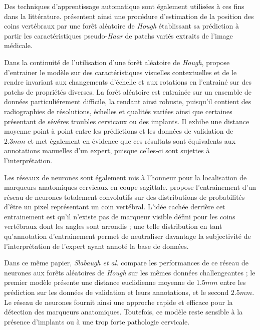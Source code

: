         Des techniques d'apprentissage automatique sont également utilisées à ces fins dans la littérature. \cite{AlArif2015a, AlArif2015b} présentent ainsi une procédure d'estimation de la position des coins vertébraux par une forêt aléatoire de {\itshape Hough} établissant sa prédiction à partir les caractéristiques pseudo-\textit{Haar} de patchs variés extraits de l'image médicale.

        Dans la continuité de l'utilisation d'une forêt aléatoire de {\itshape Hough}, \cite{AlArif2017c} propose d'entrainer le modèle sur des caractéristiques visuelles contextuelles et de le rendre invariant aux changements d'échelle et aux rotations en l'entrainé sur des patchs de propriétés diverses. La forêt aléatoire est entrainée sur un ensemble de données particuliérement difficile, la rendant ainsi robuste, puisqu'il contient des radiographies de résolutions, échelles et qualités variées ainsi que certaines présentant de sévéres troubles cervicaux ou des implants. Il exhibe une distance moyenne point à point entre les prédictions et les données de validation de $2.3 mm$ et met également en évidence que ces résultats sont équivalents aux annotations manuelles d'un expert, puisque celles-ci sont sujettes à l'interprétation.

        Les réseaux de neurones sont également mis à l'honneur pour la localisation de marqueurs anatomiques cervicaux en coupe sagittale. \cite{Slabaugh2017} propose l'entrainement d'un réseau de neurones totalement convolutifs sur des distributions de probabilités d'être un pixel représentant un coin vertébral. L'idée cachée derrière cet entrainement est qu'il n'existe pas de marqueur visible défini pour les coins vertébraux dont les angles sont arrondis ; une telle distribution en tant qu'annotation d'entrainement permet de neutraliser davantage la subjectivité de l'interprétation de l'expert ayant annoté la base de données.

        Dans ce même papier, {\itshape Slabaugh et al.} compare les performances de ce réseau de neurones aux forêts aléatoires de {\itshape Hough} sur les mêmes données challengeantes ; le premier modèle présente une distance euclidienne moyenne de $1.5 mm$ entre les prédiction sur les données de validation et leurs annotations, et le second $2.5 mm$. Le réseau de neurones fournit ainsi une approche rapide et efficace pour la détection des marqueurs anatomiques. Toutefois, ce modèle reste sensible à la présence d'implants ou à une trop forte pathologie cervicale.
        \\

